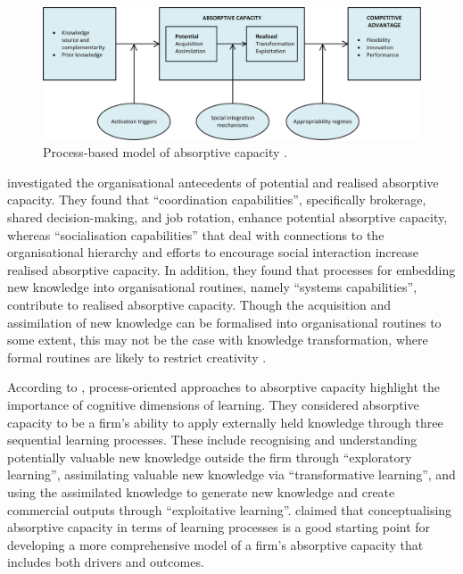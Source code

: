\begin{figure}
	\centering
	\includegraphics[width=0.9\linewidth]{Images/zahra_george}
	\caption{Process-based model of absorptive capacity \citep{zahra2002absorptive}.}
	\label{fig:zahrageorge}
\end{figure}


\citet{jansen2005managing} investigated the organisational antecedents of potential and realised absorptive capacity. They found that \enquote{coordination capabilities}, specifically brokerage, shared decision-making, and job rotation, enhance potential absorptive capacity, whereas \enquote{socialisation capabilities} that deal with connections to the organisational hierarchy and efforts to encourage social interaction increase realised absorptive capacity. In addition, they found that processes for embedding new knowledge into organisational routines, namely \enquote{systems capabilities}, contribute to realised absorptive capacity. Though the acquisition and assimilation of new knowledge can be formalised into organisational routines to some extent, this may not be the case with knowledge transformation, where formal routines are likely to restrict creativity \citep{jansen2005managing}. \medskip

According to \citet{lane2006reification}, process-oriented approaches to absorptive capacity highlight the importance of cognitive dimensions of learning. They considered absorptive capacity to be a firm's ability to apply externally held knowledge through three sequential learning processes. These include recognising and understanding potentially valuable new knowledge outside the firm through \enquote{exploratory learning}, assimilating valuable new knowledge via \enquote{transformative learning}, and using the assimilated knowledge to generate new knowledge and create commercial outputs through \enquote{exploitative learning}. \citet{lane2006reification} claimed that conceptualising absorptive capacity in terms of learning processes is a good starting point for developing a more comprehensive model of a firm’s absorptive capacity that includes both drivers and outcomes.\medskip

